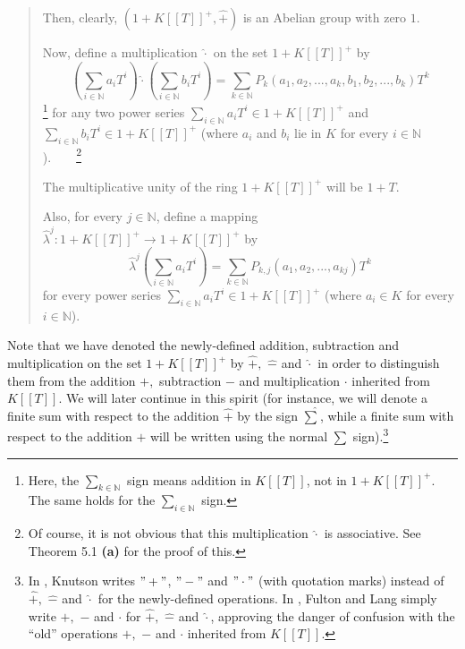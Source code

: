 \documentclass[numbers=enddot,12pt,final,onecolumn,notitlepage]{scrartcl}%
\begin{document}
\begin{quote}
Then, clearly, $\left(  1+K\left[  \left[  T\right]  \right]  ^{+}%
,\widehat{+}\right)  $ is an Abelian group with zero $1$.

Now, define a multiplication $\widehat{\cdot}$ on the set $1+K\left[  \left[
T\right]  \right]  ^{+}$ by%
\[
\left(  \sum_{i\in\mathbb{N}}a_{i}T^{i}\right)  \widehat{\cdot}\left(
\sum_{i\in\mathbb{N}}b_{i}T^{i}\right)  =\sum_{k\in\mathbb{N}}P_{k}\left(
a_{1},a_{2},...,a_{k},b_{1},b_{2},...,b_{k}\right)  T^{k}%
\]
\footnote{Here, the $\sum\limits_{k\in\mathbb{N}}$ sign means addition in
$K\left[  \left[  T\right]  \right]  $, not in $1+K\left[  \left[  T\right]
\right]  ^{+}$. The same holds for the $\sum\limits_{i\in\mathbb{N}}$ sign.}
for any two power series $\sum\limits_{i\in\mathbb{N}}a_{i}T^{i}\in1+K\left[
\left[  T\right]  \right]  ^{+}$ and $\sum\limits_{i\in\mathbb{N}}b_{i}%
T^{i}\in1+K\left[  \left[  T\right]  \right]  ^{+}$ (where $a_{i}$ and $b_{i}$
lie in $K$ for every $i\in\mathbb{N}$).\ \ \ \ \footnote{Of course, it is not
obvious that this multiplication $\widehat{\cdot}$ is associative. See Theorem
5.1 \textbf{(a)} for the proof of this.}

The multiplicative unity of the ring $1+K\left[  \left[  T\right]  \right]
^{+}$ will be $1+T$.

Also, for every $j\in\mathbb{N}$, define a mapping $\widehat{\lambda}%
^{j}:1+K\left[  \left[  T\right]  \right]  ^{+}\rightarrow1+K\left[  \left[
T\right]  \right]  ^{+}$ by%
\[
\widehat{\lambda}^{j}\left(  \sum_{i\in\mathbb{N}}a_{i}T^{i}\right)
=\sum_{k\in\mathbb{N}}P_{k,j}\left(  a_{1},a_{2},...,a_{kj}\right)  T^{k}%
\]
for every power series $\sum\limits_{i\in\mathbb{N}}a_{i}T^{i}\in1+K\left[
\left[  T\right]  \right]  ^{+}$ (where $a_{i}\in K$ for every $i\in
\mathbb{N}$).
\end{quote}

Note that we have denoted the newly-defined addition, subtraction and
multiplication on the set $1+K\left[  \left[  T\right]  \right]  ^{+}$ by
$\widehat{+},$ $\widehat{-}$ and $\widehat{\cdot}$ in order to distinguish
them from the addition $+,$ subtraction $-$ and multiplication $\cdot$
inherited from $K\left[  \left[  T\right]  \right]  $. We will later continue
in this spirit (for instance, we will denote a finite sum with respect to the
addition $\widehat{+}$ by the sign $\widehat{\sum}$, while a finite sum with
respect to the addition $+$ will be written using the normal $\sum$
sign).\footnote{In \cite{Knut73}, Knutson writes $"+"$, $"-"$ and $"\cdot"$
(with quotation marks) instead of $\widehat{+},$ $\widehat{-}$ and
$\widehat{\cdot}$ for the newly-defined operations. In \cite{FulLan85}, Fulton
and Lang simply write $+,$ $-$ and $\cdot$ for $\widehat{+},$ $\widehat{-}$
and $\widehat{\cdot}$, approving the danger of confusion with the ``old''
operations $+,$ $-$ and $\cdot$ inherited from $K\left[  \left[  T\right]
\right]  $.}
\end{document}
